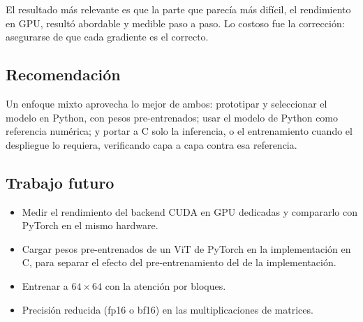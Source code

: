 \documentclass[11pt,a4paper]{article}
\begin{document}
El resultado más relevante es que la parte que parecía más difícil, el
rendimiento en GPU, resultó abordable y medible paso a paso. Lo costoso fue la
corrección: asegurarse de que cada gradiente es el correcto.

\subsection{Recomendación}

Un enfoque mixto aprovecha lo mejor de ambos: prototipar y seleccionar el
modelo en Python, con pesos pre-entrenados; usar el modelo de Python como
referencia numérica; y portar a C solo la inferencia, o el entrenamiento cuando
el despliegue lo requiera, verificando capa a capa contra esa referencia.

\subsection{Trabajo futuro}

\begin{itemize}
  \item Medir el rendimiento del backend CUDA en GPU dedicadas y compararlo con
        PyTorch en el mismo hardware.
  \item Cargar pesos pre-entrenados de un ViT de PyTorch en la implementación en
        C, para separar el efecto del pre-entrenamiento del de la
        implementación.
  \item Entrenar a $64\times64$ con la atención por bloques.
  \item Precisión reducida (fp16 o bf16) en las multiplicaciones de matrices.
\end{itemize}
\end{document}
